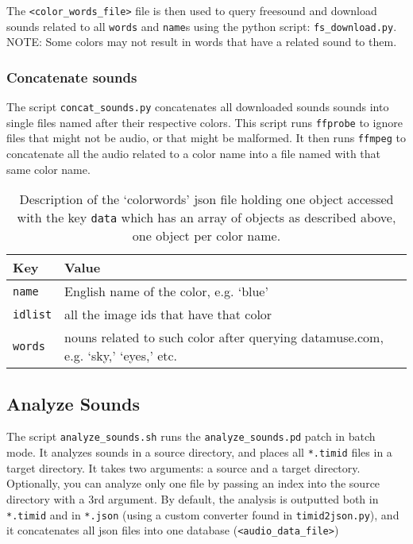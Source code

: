 The \texttt{<color\_words\_file>} file is then used to query \gls{freesound} and download sounds related to all \texttt{words} and \texttt{name}s using the python script: \texttt{fs\_download.py}. NOTE: Some colors may not result in words that have a related sound to them.


\subsubsection{Concatenate sounds}

The script \texttt{concat\_sounds.py} concatenates all downloaded sounds sounds into single files named after their respective colors. This script runs \texttt{ffprobe} to ignore files that might not be audio, or that might be malformed. It then runs \texttt{ffmpeg} to concatenate all the audio related to a color name into a file named with that same color name.




\begin{table}
\begin{tabular}{l | l}

Key     & Value

\tabularnewline
\hline


\texttt{name}    & English name of the color, e.g. `blue'

\tabularnewline
\hline

\texttt{idlist}  & all the image ids that have that color

\tabularnewline
\hline

\texttt{words}   & nouns related to such color after querying datamuse.com, e.g. `sky,' `eyes,' etc. 

\end{tabular}
\label{tab:colorwords}
\caption{Description of the `colorwords' \gls{json} file holding one object accessed with the key \texttt{data} which has an array of objects as described above, one object per color name.}
\end{table}


\subsection{Analyze Sounds}



The script \texttt{analyze\_sounds.sh} runs the \texttt{analyze\_sounds.pd} patch in batch mode. It analyzes sounds in a source directory, and places all \texttt{*.timid} files in a target directory. It takes two arguments: a source and a target directory. Optionally, you can analyze only one file by passing an index into the source directory with a 3rd argument. By default, the analysis is outputted both in \texttt{*.timid} and in \texttt{*.json} (using a custom converter found in \texttt{timid2json.py}), and it concatenates all \gls{json} files into one database (\texttt{<audio\_data\_file>})


